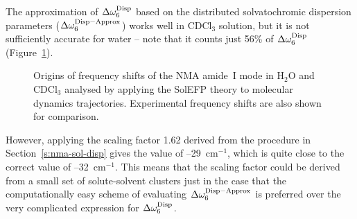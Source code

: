 \documentclass[b5paper,oneside,fleqn,11pt]{book}
\begin{document}
\begin{refsection}
The approximation of $\Delta\omega^{\rm Disp}_6$
based on the distributed
solvatochromic dispersion parameters ($\Delta\omega^{\rm Disp-Approx}_6$)
works
well in CDCl$_3$ solution, but it is not sufficiently accurate for
water -- note that it counts just 56\% of $\Delta\omega^{\rm Disp}_6$
(Figure~\ref{f:nma-solefp-md}).
%
\begin{figure}[t!]
\centering
\setlength\fboxsep{0.4pt}
\setlength\fboxrule{0.5pt}
\caption{
Origins of frequency shifts of the NMA amide~I mode 
in H$_2$O and CDCl$_3$ analysed by applying 
the SolEFP theory to molecular dynamics trajectories. 
Experimental frequency shifts are also shown for comparison.
\label{f:nma-solefp-md}}
\end{figure}
%
However, applying the scaling factor 1.62 derived from the
procedure in Section~\ref{s:nma-sol-disp} 
gives the value of --29~cm$^{-1}$, which
is quite close to the correct value of --32~cm$^{-1}$. This means
that the scaling factor could be derived from a small set of
solute\hyp{}solvent clusters just in the case that the computationally
easy scheme of evaluating $\Delta\omega^{\rm Disp-Approx}_6$ is preferred over the very
complicated expression for $\Delta\omega^{\rm Disp}_6$.


\end{refsection}
\end{document}

